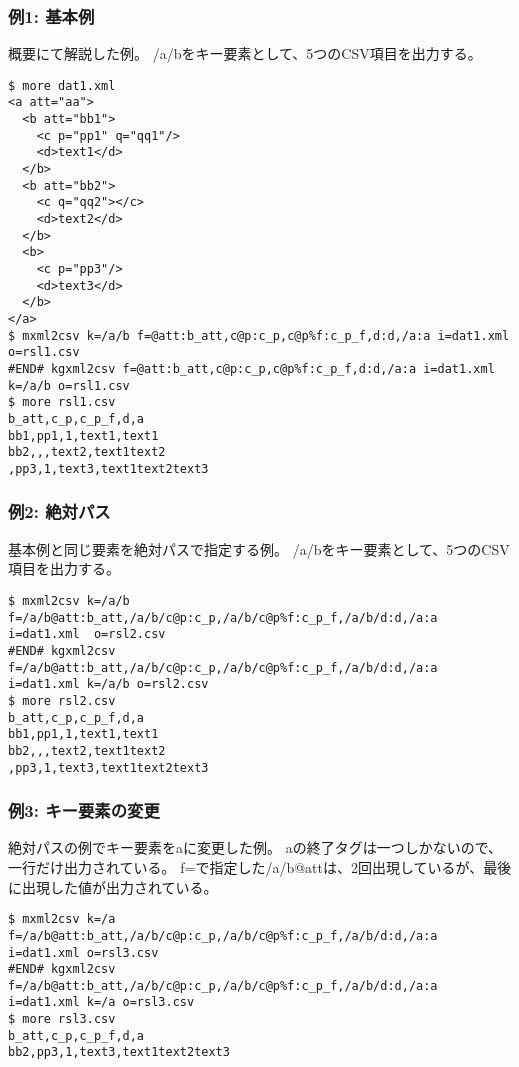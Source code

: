 \subsubsection*{例1: 基本例}

概要にて解説した例。
/a/bをキー要素として、5つのCSV項目を出力する。


\begin{Verbatim}[baselinestretch=0.7,frame=single]
$ more dat1.xml
<a att="aa">
  <b att="bb1">
    <c p="pp1" q="qq1"/>
    <d>text1</d>
  </b>
  <b att="bb2">
    <c q="qq2"></c>
    <d>text2</d>
  </b>
  <b>
    <c p="pp3"/>
    <d>text3</d>
  </b>
</a>
$ mxml2csv k=/a/b f=@att:b_att,c@p:c_p,c@p%f:c_p_f,d:d,/a:a i=dat1.xml  o=rsl1.csv
#END# kgxml2csv f=@att:b_att,c@p:c_p,c@p%f:c_p_f,d:d,/a:a i=dat1.xml k=/a/b o=rsl1.csv
$ more rsl1.csv
b_att,c_p,c_p_f,d,a
bb1,pp1,1,text1,text1
bb2,,,text2,text1text2
,pp3,1,text3,text1text2text3
\end{Verbatim}
\subsubsection*{例2: 絶対パス}

基本例と同じ要素を絶対パスで指定する例。
/a/bをキー要素として、5つのCSV項目を出力する。


\begin{Verbatim}[baselinestretch=0.7,frame=single]
$ mxml2csv k=/a/b f=/a/b@att:b_att,/a/b/c@p:c_p,/a/b/c@p%f:c_p_f,/a/b/d:d,/a:a i=dat1.xml  o=rsl2.csv
#END# kgxml2csv f=/a/b@att:b_att,/a/b/c@p:c_p,/a/b/c@p%f:c_p_f,/a/b/d:d,/a:a i=dat1.xml k=/a/b o=rsl2.csv
$ more rsl2.csv
b_att,c_p,c_p_f,d,a
bb1,pp1,1,text1,text1
bb2,,,text2,text1text2
,pp3,1,text3,text1text2text3
\end{Verbatim}
\subsubsection*{例3: キー要素の変更}

絶対パスの例でキー要素をaに変更した例。
aの終了タグは一つしかないので、一行だけ出力されている。
f=で指定した/a/b@attは、2回出現しているが、最後に出現した値が出力されている。


\begin{Verbatim}[baselinestretch=0.7,frame=single]
$ mxml2csv k=/a f=/a/b@att:b_att,/a/b/c@p:c_p,/a/b/c@p%f:c_p_f,/a/b/d:d,/a:a i=dat1.xml o=rsl3.csv
#END# kgxml2csv f=/a/b@att:b_att,/a/b/c@p:c_p,/a/b/c@p%f:c_p_f,/a/b/d:d,/a:a i=dat1.xml k=/a o=rsl3.csv
$ more rsl3.csv
b_att,c_p,c_p_f,d,a
bb2,pp3,1,text3,text1text2text3
\end{Verbatim}
